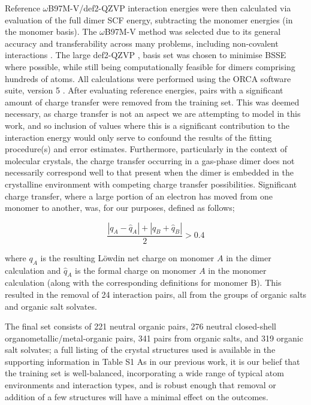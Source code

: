 \documentclass[preprint]{iucr}              %
\begin{document}
Reference $\omega$B97M-V/def2-QZVP interaction energies were then calculated via evaluation of the full dimer SCF energy, subtracting
the monomer energies (in the monomer basis). The $\omega$B97M-V method \cite{Mardirossian2016} was selected due to its
general accuracy and transferability across many problems, including non-covalent interactions \cite{Najibi2018}.
The large def2-QZVP \cite{Weigend2003, Weigend2005, Peterson2003}, basis set was chosen to 
minimise BSSE where possible, while still being computationally feasible for dimers comprising hundreds of atoms. 
All calculations were performed using the ORCA software suite, version 5 \cite{Neese2022}. 
After evaluating reference energies, pairs with a significant amount of charge transfer were removed from the training set.
This was deemed necessary, as charge transfer is not an aspect we are attempting to model in this work, and so inclusion of values
where this is a significant contribution to the interaction energy would only serve to confound the results of the fitting
procedure(s) and error estimates. Furthermore, particularly in the context of molecular crystals, the charge transfer occurring in a gas-phase dimer does not necessarily correspond well to that present when the dimer is embedded in the crystalline environment with competing charge transfer possibilities.
Significant charge transfer, where a large portion of an electron has moved from one monomer to another, was, for our purposes, defined as follows;

\begin{equation}
    \frac{|q_A - \hat{q}_A| + |q_B + \hat{q}_B|}{2}  > 0.4
\end{equation}

where $q_A$ is the resulting L\"{o}wdin net charge on monomer $A$ in the dimer calculation and $\hat{q}_A$ is the formal charge on monomer $A$ in the monomer calculation (along with the corresponding definitions for monomer B). This resulted
in the removal of 24 interaction pairs, all from the groups of organic salts and organic salt solvates.

The final set consists of 221 neutral organic pairs, 276 neutral closed-shell organometallic/metal-organic pairs,
341 pairs from organic salts, and 319 organic salt solvates; a full listing of the crystal structures used is available in the supporting information in Table S1 %
As in our previous work, it is our belief that the training set is well-balanced, incorporating a wide range of typical atom environments
and interaction types, and is robust enough that removal or addition of a few structures will have a minimal effect on the outcomes.
\end{document}

